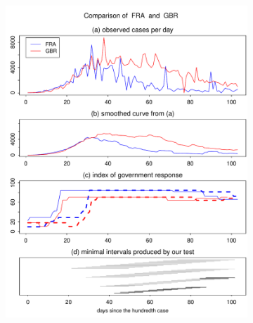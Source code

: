 \documentclass[a4paper,12pt]{article}
\numberwithin{equation}{section}
\begin{document}
\begin{figure}[t!]
\begin{subfigure}[b]{0.475\textwidth}
\includegraphics[width=\textwidth]{plots/FRA_vs_GBR}
\end{subfigure}
\end{figure}
\end{document}
